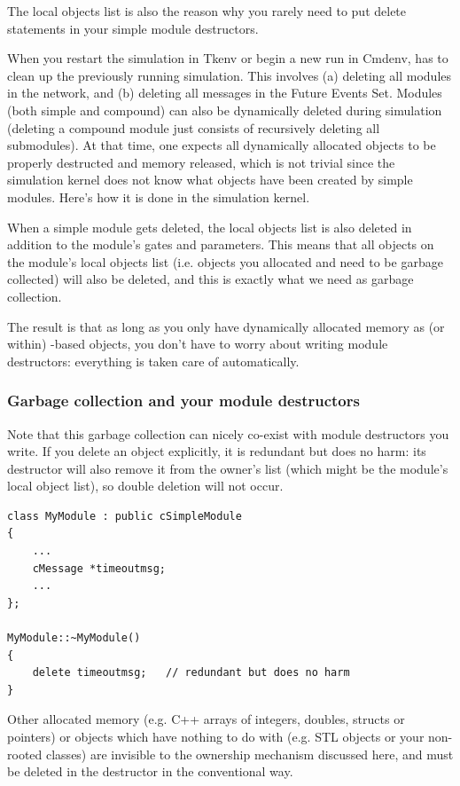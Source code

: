 The local objects list is also the reason why you rarely need to
put delete statements in your simple module destructors.

When you restart the simulation in Tkenv or begin a new run in Cmdenv,
{\opp} has to clean up the previously running simulation.
This involves (a) deleting all modules in the network, and
(b) deleting all messages in the Future Events Set.
Modules (both simple and compound) can also be dynamically deleted
during simulation (deleting a compound module just consists
of recursively deleting all submodules). At that time,
one expects all dynamically allocated objects to be properly
destructed and memory released, which is not trivial since the
simulation kernel does not know what objects have been created
by simple modules. Here's how it is done in the simulation kernel.

When a simple module gets deleted, the local objects list is also
deleted in addition to the module's gates and parameters.
This means that all objects on the module's local objects list
(i.e. objects you allocated and need to be garbage collected)
will also be deleted, and this is exactly what we need as garbage
collection.

The result is that as long as you only have dynamically allocated
memory as (or within) -based objects,
you don't have to worry about writing module destructors:
everything is taken care of automatically.

\subsubsection{Garbage collection and your module destructors}

Note that this garbage collection can nicely co-exist with module destructors
you write. If you delete an object explicitly, it is redundant
but does no harm: its destructor will also remove it from the
owner's list (which might be the module's local object list),
so double deletion will not occur.

\begin{verbatim}
class MyModule : public cSimpleModule
{
    ...
    cMessage *timeoutmsg;
    ...
};

MyModule::~MyModule()
{
    delete timeoutmsg;   // redundant but does no harm
}
\end{verbatim}

Other allocated memory (e.g. C++ arrays of integers, doubles, structs
or pointers) or objects which have nothing to do with 
(e.g. STL objects or your non- rooted classes)
are invisible to the ownership mechanism discussed here,
and must be deleted in the destructor in the conventional way.

